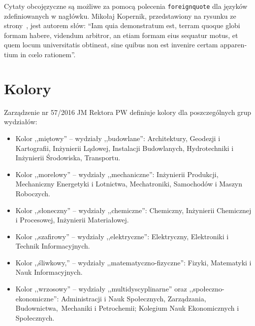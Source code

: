 Cytaty obcojęzyczne są możliwe za pomocą polecenia \texttt{foreignquote} dla języków zdefiniowanych w nagłówku. Mikołaj Kopernik, przedstawiony na rysunku ze strony~\pageref{rys:kopernik}, jest autorem słów: \foreignquote{latin}{Iam quia demonstratum est, terram quoque globi formam habere, videndum arbitror, an etiam formam eius sequatur motus, et quem locum universitatis obtineat, sine quibus non est invenire certam apparentium in cœlo rationem}.

\section{Kolory}
Zarządzenie nr 57/2016 JM Rektora PW definiuje kolory dla poszczególnych grup wydziałów:
\begin{itemize}
 \item Kolor ,,miętowy'' -- \colorbox{bud}{wydziały ,,budowlane'':}{\color{bud} Architektury, Geodezji i Kartografii, Inżynierii Lądowej, Instalacji Budowlanych, Hydrotechniki i Inżynierii Środowiska, Transportu.}
 \item Kolor ,,morelowy'' -- \colorbox{mech}{wydziały ,,mechaniczne'':}{\color{mech} Inżynierii Produkcji, Mechaniczny Energetyki i Lotnictwa, Mechatroniki, Samochodów i Maszyn Roboczych.}
 \item Kolor ,,słoneczny'' -- \colorbox{chem}{wydziały ,,chemiczne'':}{\color{chem} Chemiczny, Inżynierii Chemicznej i Procesowej, Inżynierii Materiałowej.}
 \item Kolor ,,szafirowy'' -- \colorbox{elek}{wydziały ,,elektryczne'':}{\color{elek} Elektryczny, Elektroniki i Technik Informacyjnych.}
 \item Kolor ,,śliwkowy,'' -- \colorbox{mfiz}{wydziały ,,matematyczno-fizyczne'':}{\color{mfiz} Fizyki, Matematyki i Nauk Informacyjnych.}
 \item Kolor ,,wrzosowy'' -- \colorbox{multi}{wydziały ,,multidyscyplinarne'' oraz ,,społeczno-ekonomiczne'':}{\color{multi} Administracji i Nauk Społecznych, Zarządzania, Budownictwa,~Mechaniki i Petrochemii; Kolegium Nauk Ekonomicznych i Społecznych.}
\end{itemize}

